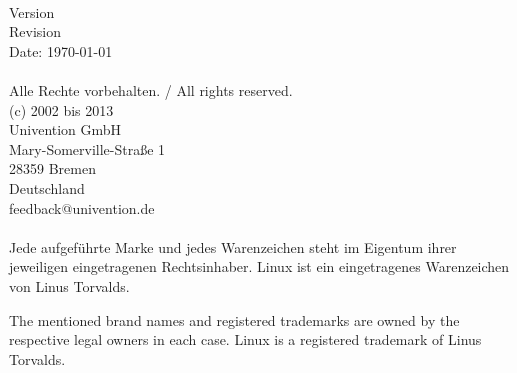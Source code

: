 
\begin{titlepage}
  \thispagestyle{empty}


  \vspace*{3cm}
  \sffamily \bfseries
  \begin{center}
    \Huge
      \ucsManualTitle \\ [3.5cm]
    \huge
      \ucsManualSubtitle
  \end{center}
  \normalsize
  \normalfont

\newpage
\AddToShipoutPicture{\ifthenelse{\isodd{\thepage}}%
	{\BackgroundPicOdd}{\BackgroundPicEven}}
\thispagestyle{empty}
\parindent0cm
\sffamily
\vspace*{12cm}

Version \ucsManualVersion \\
Revision \ucsSVNVersion \\
Date: \today \\
\\
Alle Rechte vorbehalten. / All rights reserved.\\
(c) 2002 bis 2013 \\
Univention GmbH \\
Mary-Somerville-Straße 1 \\
28359 Bremen \\
Deutschland \\
feedback@univention.de \\
\\
Jede aufgeführte Marke und jedes Warenzeichen steht im Eigentum ihrer
jeweiligen eingetragenen Rechtsinhaber. Linux ist ein eingetragenes
Warenzeichen von Linus Torvalds.

The mentioned brand names and registered trademarks are owned by the
respective legal owners in each case. Linux is a registered trademark
of Linus Torvalds.

\end{titlepage}


\dominitoc
\tableofcontents
\newpage

